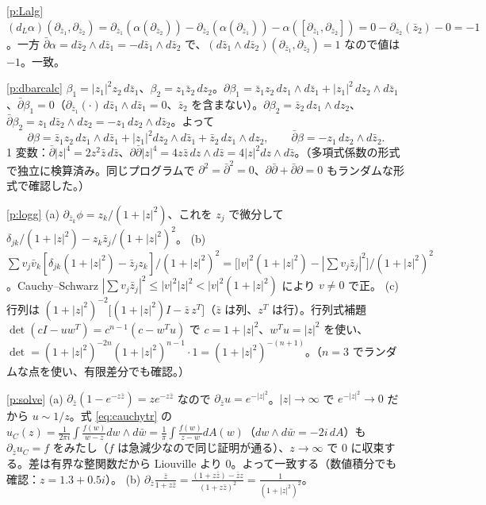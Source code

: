 \begin{sol}{\ref{p:Lalg}}
$(d_L\alpha)(\partial_{\bar z_1},\partial_{\bar z_2})=\partial_{\bar z_1}(\alpha(\partial_{\bar z_2}))-\partial_{\bar z_2}(\alpha(\partial_{\bar z_1}))-\alpha([\partial_{\bar z_1},\partial_{\bar z_2}])=0-\partial_{\bar z_2}(\bar z_2)-0=-1$。一方 $\bar\partial\alpha=d\bar z_2\wedge d\bar z_1=-d\bar z_1\wedge d\bar z_2$ で、$(d\bar z_1\wedge d\bar z_2)(\partial_{\bar z_1},\partial_{\bar z_2})=1$ なので値は $-1$。一致。
\end{sol}
\begin{sol}{\ref{p:dbarcalc}}
$\beta_1=|z_1|^2z_2\,d\bar z_1$、$\beta_2=z_1\bar z_2\,dz_2$。$\partial\beta_1=\bar z_1z_2\,dz_1\wedge d\bar z_1+|z_1|^2\,dz_2\wedge d\bar z_1$、$\bar\partial\beta_1=0$（$\partial_{\bar z_1}(\cdot)\,d\bar z_1\wedge d\bar z_1=0$、$\bar z_2$ を含まない）。$\partial\beta_2=\bar z_2\,dz_1\wedge dz_2$、$\bar\partial\beta_2=z_1\,d\bar z_2\wedge dz_2=-z_1\,dz_2\wedge d\bar z_2$。よって
\[
\partial\beta=\bar z_1z_2\,dz_1\wedge d\bar z_1+|z_1|^2dz_2\wedge d\bar z_1+\bar z_2\,dz_1\wedge dz_2,\qquad\bar\partial\beta=-z_1\,dz_2\wedge d\bar z_2 .
\]
1 変数：$\bar\partial|z|^4=2z^2\bar z\,d\bar z$、$\partial\bar\partial|z|^4=4z\bar z\,dz\wedge d\bar z=4|z|^2dz\wedge d\bar z$。（多項式係数の形式で独立に検算済み。同じプログラムで $\partial^2=\bar\partial^2=0$、$\partial\bar\partial+\bar\partial\partial=0$ もランダムな形式で確認した。）
\end{sol}
\begin{sol}{\ref{p:logg}}
(a) $\partial_{\bar z_k}\phi=z_k/(1+|z|^2)$、これを $z_j$ で微分して $\delta_{jk}/(1+|z|^2)-z_k\bar z_j/(1+|z|^2)^2$。
(b) $\sum v_j\bar v_k[\delta_{jk}(1+|z|^2)-\bar z_jz_k]/(1+|z|^2)^2=\big[|v|^2(1+|z|^2)-|\sum v_j\bar z_j|^2\big]/(1+|z|^2)^2$。Cauchy--Schwarz $|\sum v_j\bar z_j|^2\le|v|^2|z|^2<|v|^2(1+|z|^2)$ により $v\ne0$ で正。
(c) 行列は $(1+|z|^2)^{-2}\big[(1+|z|^2)I-\bar z\,z^T\big]$（$\bar z$ は列、$z^T$ は行）。行列式補題 $\det(cI-uw^T)=c^{n-1}(c-w^Tu)$ で $c=1+|z|^2$、$w^Tu=|z|^2$ を使い、$\det=(1+|z|^2)^{-2n}(1+|z|^2)^{n-1}\cdot1=(1+|z|^2)^{-(n+1)}$。（$n=3$ でランダムな点を使い、有限差分でも確認。）
\end{sol}
\begin{sol}{\ref{p:solve}}
(a) $\partial_{\bar z}(1-e^{-z\bar z})=ze^{-z\bar z}$ なので $\partial_{\bar z}u=e^{-|z|^2}$。$|z|\to\infty$ で $e^{-|z|^2}\to0$ だから $u\sim1/z$。式 \eqref{eq:cauchytr} の $u_C(z)=\frac1{2\pi i}\int\frac{f(w)}{w-z}dw\wedge d\bar w=\frac1\pi\int\frac{f(w)}{z-w}dA(w)$（$dw\wedge d\bar w=-2i\,dA$）も $\partial_{\bar z}u_C=f$ をみたし（$f$ は急減少なので同じ証明が通る）、$z\to\infty$ で $0$ に収束する。差は有界な整関数だから Liouville より $0$。よって一致する（数値積分でも確認：$z=1.3+0.5i$）。
(b) $\partial_{\bar z}\frac{\bar z}{1+z\bar z}=\frac{(1+z\bar z)-\bar zz}{(1+z\bar z)^2}=\frac1{(1+|z|^2)^2}$。
\end{sol}
